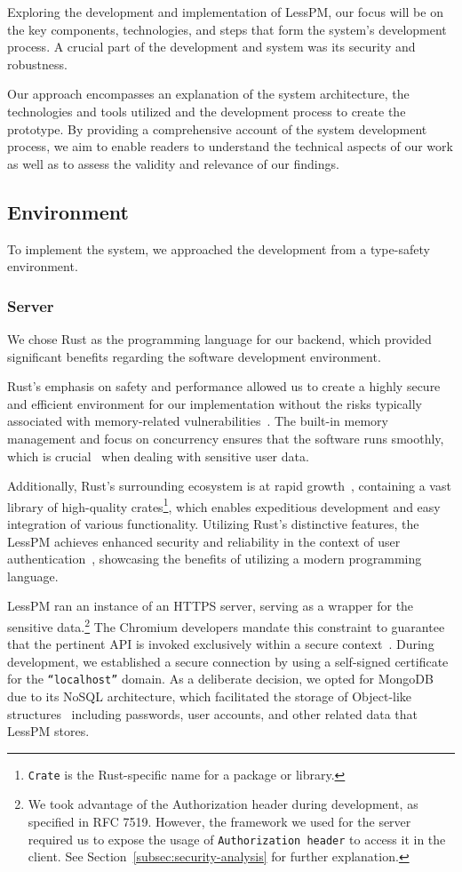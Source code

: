 
Exploring the development and implementation of LessPM, our focus will be on the
key components, technologies, and steps that form the system's development
process.
A crucial part of the development and system was its security and robustness.

Our approach encompasses an explanation of the system architecture, the
technologies and tools utilized and the development process to create the
prototype.
By providing a comprehensive account of the system development process, we aim
to enable readers to understand the technical aspects of our work as well
as to assess the validity and relevance of our findings.

\subsection{Environment}\label{subsec:environment}
To implement the system, we approached the development from a type-safety
environment.

\subsubsection{Server}
We chose Rust as the programming language for our backend, which provided
significant benefits regarding the software development environment.

Rust's emphasis on safety and performance allowed us to create a highly
secure and efficient environment for our implementation without the risks
typically associated with memory-related
vulnerabilities~\cite{rivera2019preserving}.
The built-in memory management and focus on concurrency ensures that the
software runs smoothly, which is crucial~\cite{fischer1985impossibility} when
dealing with sensitive user data.

Additionally, Rust's surrounding ecosystem is at rapid
growth~\cite{librs-stats}, containing a vast library of high-quality
crates\footnote{
  \texttt{Crate} is the Rust-specific name for a package or library.
}, which enables expeditious development and easy integration of various
functionality.
Utilizing Rust's distinctive features, the LessPM achieves enhanced security and
reliability in the context of user authentication~\cite{rivera2019preserving},
showcasing the benefits of utilizing a modern programming language.

LessPM ran an instance of an HTTPS server, serving as a wrapper for the
sensitive data.\footnote{
  We took advantage of the Authorization header during development, as specified
  in RFC 7519.
  However, the framework we used for the server required us to expose the usage
  of \texttt{Authorization header} to access it in the client.
  See Section~\ref{subsec:security-analysis} for further explanation.
}
The Chromium developers mandate this constraint to guarantee that the pertinent
API is invoked exclusively within a secure context~\cite{webdev2021credential}.
During development, we established a secure connection by using a self-signed
certificate for the \texttt{``localhost''} domain.
As a deliberate decision, we opted for MongoDB due to its NoSQL architecture,
which facilitated the storage of Object-like structures~\cite{mongodb2021nosql}
including passwords, user accounts, and other related data that LessPM stores.

